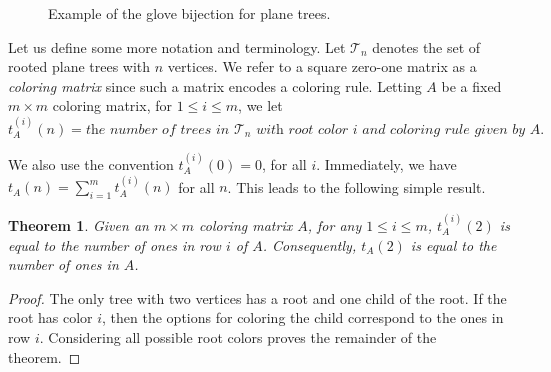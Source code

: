 \documentclass[12pt]{amsart}
\newtheorem{theorem}{Theorem}
\begin{document}
\begin{figure}[ht!]
\begin{minipage}{0.4\textwidth}
\end{minipage}
\hspace{0.5cm}
\begin{minipage}[c]{0.1\textwidth}
  \centering
\end{minipage}
\hspace{0.5cm}
\begin{minipage}{0.4\textwidth}
  \centering
\end{minipage}
    \caption{Example of the glove bijection for plane trees.}
    \label{fig:glove}
\end{figure}


Let us define some more notation and terminology. Let $\mathcal{T}_{n}$ denotes the set of rooted plane trees with $n$ vertices. We refer to a square zero-one matrix as a \emph{coloring matrix} since such a matrix encodes a coloring rule. 
Letting $A$ be a fixed $m \times m$ 
coloring matrix, for $1\leq i\leq m$, we let 
$$
t_A^{(i)}(n) =  \textit{the number of trees in $\mathcal{T}_{n}$ with root color $i$ and coloring rule given by $A$.}
$$ 

We also use the convention $t^{(i)}_A(0)=0$, for all $i$. 
Immediately, we have $t_A(n)=\sum_{i=1}^mt_A^{(i)}(n)$ for all $n$. 
This leads to the following simple result.
\begin{theorem}\label{prop:t2}
    Given an $m\times m$ coloring matrix $A$, for any $1\leq i\leq m$, $t^{(i)}_A(2)$ is equal to the number of ones in row $i$ of $A$. Consequently, $t_A(2)$ is equal to the number of ones in $A$.
\end{theorem}
\begin{proof}
    The only tree with two vertices has a root and one child of the root. If the root has color $i$, then the options for coloring the child correspond to the ones in row $i$. Considering all possible root colors proves the remainder of the theorem.
\end{proof}
\end{document}
